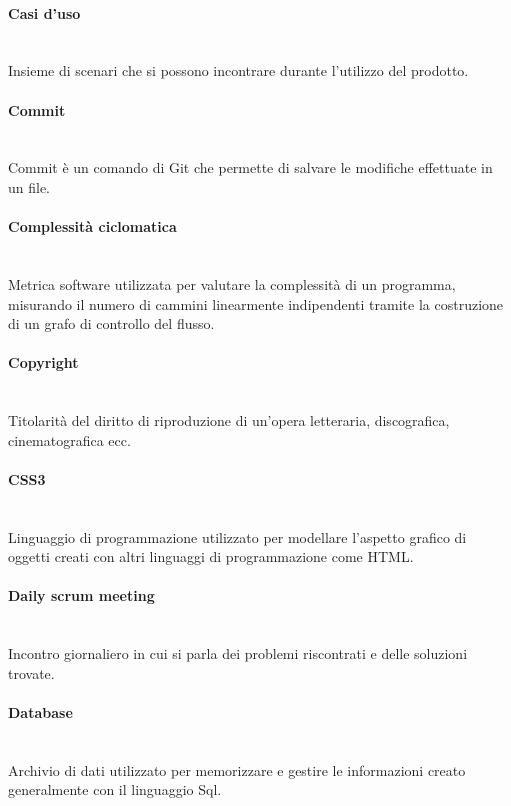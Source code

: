 \paragraph{Casi d'uso}~\smallskip \\
Insieme di scenari che si possono incontrare durante l'utilizzo del prodotto.

\paragraph{Commit}~\smallskip \\
Commit è un comando di Git che permette di salvare le modifiche effettuate in un file.

\paragraph{Complessità ciclomatica}~\smallskip \\
Metrica software utilizzata per valutare la complessità di un programma, misurando il numero di cammini linearmente indipendenti tramite la costruzione di un grafo di controllo del flusso.

\paragraph{Copyright}~\smallskip \\
Titolarità del diritto di riproduzione di un'opera letteraria, discografica, cinematografica ecc.

\paragraph{CSS3}~\smallskip \\
Linguaggio di programmazione utilizzato per modellare l'aspetto grafico di oggetti creati con altri linguaggi di programmazione come HTML.

\paragraph{Daily scrum meeting}~\smallskip \\
Incontro giornaliero in cui si parla dei problemi riscontrati e delle soluzioni trovate.

\paragraph{Database}~\smallskip \\
Archivio di dati utilizzato per memorizzare e gestire le informazioni creato generalmente con il linguaggio Sql.

